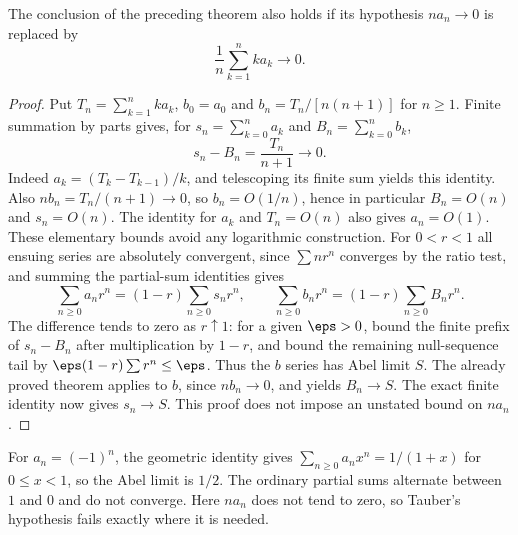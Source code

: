 \begin{corollary}
The conclusion of the preceding theorem also holds if its hypothesis $na_n\to0$ is replaced by
\[
 \frac1n\sum_{k=1}^n k a_k\longrightarrow0.
\]
\end{corollary}
\begin{proof}
Put $T_n=\sum_{k=1}^nka_k$, $b_0=a_0$ and $b_n=T_n/[n(n+1)]$ for $n\geq1$. Finite summation by parts gives, for $s_n=\sum_{k=0}^na_k$ and $B_n=\sum_{k=0}^nb_k$,
\[
 s_n-B_n=\frac{T_n}{n+1}\longrightarrow0.
\]
Indeed $a_k=(T_k-T_{k-1})/k$, and telescoping its finite sum yields this identity. Also $nb_n=T_n/(n+1)\to0$, so $b_n=O(1/n)$, hence in particular $B_n=O(n)$ and $s_n=O(n)$. The identity for $a_k$ and $T_n=O(n)$ also gives $a_n=O(1)$. These elementary bounds avoid any logarithmic construction. For $0<r<1$ all ensuing series are absolutely convergent, since $\sum nr^n$ converges by the ratio test, and summing the partial-sum identities gives
\[
 \sum_{n\geq0}a_nr^n=(1-r)\sum_{n\geq0}s_nr^n,
 \qquad \sum_{n\geq0}b_nr^n=(1-r)\sum_{n\geq0}B_nr^n.
\]
The difference tends to zero as $r\uparrow1$: for a given $\eps>0$, bound the finite prefix of $s_n-B_n$ after multiplication by $1-r$, and bound the remaining null-sequence tail by $\eps(1-r)\sum r^n\leq\eps$. Thus the $b$ series has Abel limit $S$. The already proved theorem applies to $b$, since $nb_n\to0$, and yields $B_n\to S$. The exact finite identity now gives $s_n\to S$. This proof does not impose an unstated bound on $na_n$.
\end{proof}

\begin{example}
For $a_n=(-1)^n$, the geometric identity gives $\sum_{n\geq0}a_nx^n=1/(1+x)$ for $0\leq x<1$, so the Abel limit is $1/2$. The ordinary partial sums alternate between $1$ and $0$ and do not converge. Here $na_n$ does not tend to zero, so Tauber's hypothesis fails exactly where it is needed.
\end{example}

